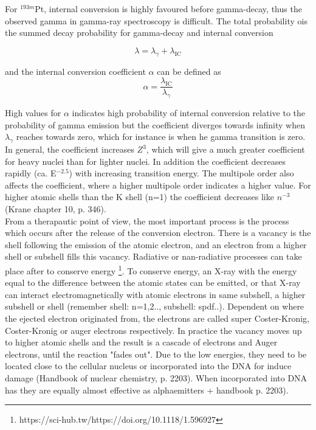 \documentclass[a4paper,11pt,twoside]{book}
\begin{document}
\noindent 
For $^{193m}$Pt, internal conversion is highly favoured before gamma-decay, thus the observed gamma in gamma-ray spectroscopy is difficult. The total probability ois the summed decay probability for gamma-decay and internal conversion 

\begin{equation}
    \lambda = \lambda_\gamma + \lambda_\text{IC}
\end{equation}

and the internal conversion coefficient $\alpha$ can be defined as 
\begin{equation}
    \alpha = \frac{\lambda_\text{IC}}{\lambda_\gamma}
\end{equation}

High values for $\alpha$ indicates high probability of internal conversion relative to the probability of gamma emission but the coefficient diverges towards infinity when $\lambda_\gamma$ reaches towards zero, which for instance is when he gamma transition is zero. In general, the coefficient increases $Z^3$, which will give a much greater coefficient for heavy nuclei than for lighter nuclei. In addition the coefficient decreases rapidly (ca. E$^{-2.5}$) with increasing transition energy. The multipole order also affects the coefficient, where a higher multipole order indicates a higher value. For higher atomic shells than the K shell (n=1) the coefficient decreases like $n^{-3}$ (Krane chapter 10, p. 346). \\

\noindent 
From a therapautic point of view, the most important process is the process which occurs after the release of the conversion electron. There is a vacancy is the shell following the emission of the atomic electron, and an electron from a higher shell or subshell fills  this vacancy. Radiative or nan-radiative processes can take place after to conserve energy \footnote{https://sci-hub.tw/https://doi.org/10.1118/1.596927}. To conserve energy, an X-ray with the energy equal to the difference between the atomic states can be emitted, or that X-ray can interact electromagnetically with atomic electrons in same subshell, a higher subshell or shell (remember shell: n=1,2.., subshell: spdf..). Dependent on where the ejected electron originated from, the electrons are called super Coster-Kronig, Coster-Kronig or auger electrons respectively. In practice the vacancy moves up to higher atomic shells and the result is a cascade of electrons and Auger electrons, until the reaction "fades out". Due to the low energies, they need to be located close to the cellular nucleus or incorporated into the DNA for induce damage (Handbook of nuclear chemistry, p. 2203). When incorporated into DNA has they are equally almost effective as alphaemitters \cite{Howell1991} + handbook p. 2203). 
\newpage
\end{document}
